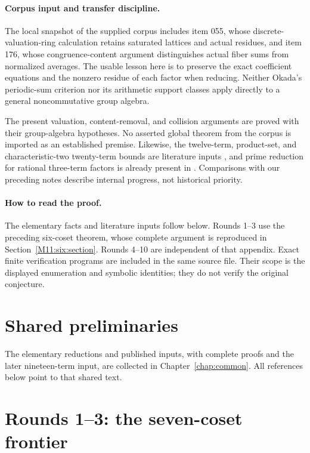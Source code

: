 \documentclass[11pt,a4paper,oneside]{report}
\theoremstyle{definition}
\theoremstyle{remark}
\begin{document}
\paragraph{Corpus input and transfer discipline.}
The local snapshot of the supplied corpus \cite{B:Corpus} includes
item 055, whose discrete-valuation-ring calculation retains saturated
lattices and actual residues, and item 176, whose congruence-content
argument distinguishes actual fiber sums from normalized averages.
The usable lesson here is to preserve the exact coefficient equations
and the nonzero residue of each factor when reducing. Neither
Okada's periodic-sum criterion nor its arithmetic support classes
apply directly to a general noncommutative group algebra.

The present valuation, content-removal, and collision arguments are
proved with their group-algebra hypotheses. No asserted global
theorem from the corpus is imported as an established premise.
Likewise, the twelve-term, product-set, and characteristic-two
twenty-term bounds are literature inputs \cite{B:AJ,B:ATsmall}, and prime
reduction for rational three-term factors is already present in
\cite{B:ATrational}. Comparisons with our preceding notes describe
internal progress, not historical priority.

\paragraph{How to read the proof.}
The elementary facts and literature inputs follow below. Rounds 1--3
use the preceding six-coset theorem, whose complete argument is
reproduced in Section~\ref{M11:six:section}. Rounds 4--10 are independent
of that appendix. Exact finite verification programs are included
in the same source file. Their scope is the displayed enumeration
and symbolic identities; they do not verify the original conjecture.

\section{Shared preliminaries}
The elementary reductions and published inputs, with complete proofs and
the later nineteen-term input, are collected in Chapter~\ref{chap:common}.
All references below point to that shared text.
\section{Rounds 1--3: the seven-coset frontier}
\label{M12:frontier:section}
\end{document}
